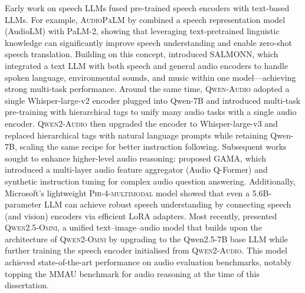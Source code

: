 \documentclass{report}
\begin{document}
Early work on speech LLMs fused pre-trained speech encoders with text-based LLMs. For example, \textsc{AudioPaLM} by \citet{rubenstein2023audiopalmlargelanguagemodel} combined a speech representation model (AudioLM) with PaLM-2, showing that leveraging text-pretrained linguistic knowledge can significantly improve speech understanding and enable zero-shot speech translation. Building on this concept, \citet{tang2024salmonngenerichearingabilities} introduced \textsc{SALMONN}, which integrated a text LLM with both speech and general audio encoders to handle spoken language, environmental sounds, and music within one model—achieving strong multi-task performance. Around the same time, \textsc{Qwen-Audio} \citep{chu2023qwenaudioadvancinguniversalaudio} adopted a single Whisper-large-v2 encoder plugged into Qwen-7B and introduced multi-task pre-training with hierarchical tags to unify many audio tasks with a single audio encoder. \textsc{Qwen2-Audio} \citep{chu2024qwen2audiotechnicalreport} then upgraded the encoder to Whisper-large-v3 and replaced hierarchical tags with natural language prompts while retaining Qwen-7B, scaling the same recipe for better instruction following. Subsequent works sought to enhance higher-level audio reasoning: \citet{ghosh2024gamalargeaudiolanguagemodel} proposed \textsc{GAMA}, which introduced a multi-layer audio feature aggregator (Audio Q-Former) and synthetic instruction tuning for complex audio question answering. Additionally, Microsoft’s lightweight \textsc{Phi-4-multimodal} model \citep{microsoft2025phi4minitechnicalreportcompact} showed that even a 5.6B-parameter LLM can achieve robust speech understanding by connecting speech (and vision) encoders via efficient LoRA adapters. Most recently, \citet{xu2025qwen25omnitechnicalreport} presented \textsc{Qwen2.5-Omni}, a unified text–image–audio model that builds upon the architecture of \textsc{Qwen2-Omni} by upgrading to the Qwen2.5-7B base LLM while further training the speech encoder initialised from \textsc{Qwen2-Audio}. This model achieved state-of-the-art performance on audio evaluation benchmarks, notably topping the \textsc{MMAU} benchmark \citep{sakshi2024mmaumassivemultitaskaudio} for audio reasoning at the time of this dissertation.
\end{document}
